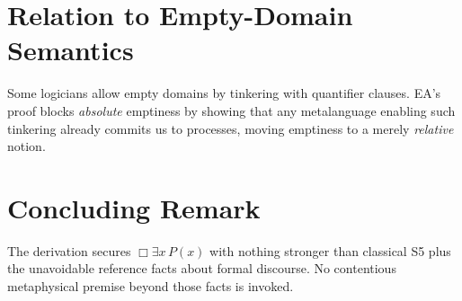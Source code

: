\documentclass[11pt]{article}
\newcommand{\bx}{\Box}
\theoremstyle{definition}
\begin{document}
\section{Relation to Empty-Domain Semantics}

Some logicians allow empty domains by tinkering with quantifier clauses.  
EA’s proof blocks \emph{absolute} emptiness by showing that any metalanguage enabling such tinkering already commits us to processes, moving emptiness to a merely \emph{relative} notion.

\section{Concluding Remark}

The derivation secures $\bx\exists x\,P(x)$ with nothing stronger than classical S5 plus the unavoidable reference facts about formal discourse. No contentious metaphysical premise beyond those facts is invoked.
\end{document}
